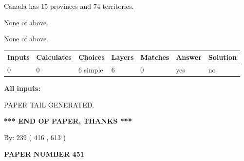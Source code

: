 \documentclass[12pt]{article}
\begin{document}
 
Canada has  15 provinces and  74 territories.
 
 
 None of above.
 
 
\noindent{}
 
 
 None of above.
 
 
\noindent{}
 
 
   
   
   
   
\noindent\begin{tabular}{|l|l|l|l|l|l|l|}
 \hline
Inputs & Calculates & Choices & Layers & Matches & Answer & Solution \\ \hline
 0  & 
 0  & 
 6
  simple  
  & 
 6  & 
 0  & 
  yes & 
  no 
  \\ \hline
 \end{tabular}
   
   
   
   
\noindent{}
   
   
   
   
\noindent\vspace{0.1in}\hspace{-0.08in} {\textbf{\Large{All inputs: }}}
   
   
   
   
   
   
 \vspace{0.2in}
 
   
   
\vspace{2.0in} PAPER TAIL GENERATED.
   
   
   
   
\vspace{1.0in} 
{\textbf{\large{ *** END OF PAPER, THANKS *** }}} 
   
   
\hspace{1.0in} By: 
 239 ( 416 ,  613 )
   
   
   
   
\newpage 
\setcounter{page}{ 
   451001 } 
   
   
   
   
 {\textbf{ \Large{ PAPER NUMBER  451  }}}
   
\end{document}
